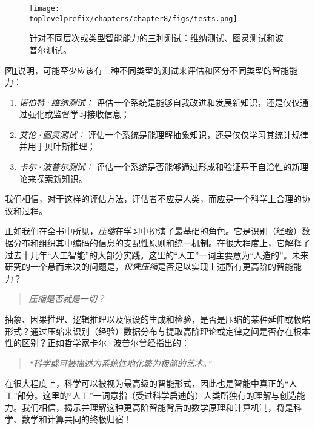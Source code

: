 \documentclass[../../book-main_zh.tex]{subfiles}
\begin{document}
\begin{figure}[t]
    \centering
    \texttt{[image: \\toplevelprefix/chapters/chapter8/figs/tests.png]}
    \caption{针对不同层次或类型智能能力的三种测试：维纳测试、图灵测试和波普尔测试。}
    \label{fig:three-tests}
\end{figure}

图\ref{fig:three-tests}说明，可能至少应该有三种不同类型的测试来评估和区分不同类型的智能能力：
\begin{enumerate}
    \item {\em 诺伯特·维纳测试：} 评估一个系统是能够自我改进和发展新知识，还是仅仅通过强化或监督学习接收信息；
    \item {\em 艾伦·图灵测试：} 评估一个系统是能理解抽象知识，还是仅仅学习其统计规律并用于贝叶斯推理；
    \item {\em 卡尔·波普尔测试：} 评估一个系统是否能够通过形成和验证基于自洽性的新理论来探索新知识。
\end{enumerate}
我们相信，对于这样的评估方法，评估者不应是人类，而应是一个科学上合理的协议和过程。



正如我们在全书中所见，\textit{压缩}在学习中扮演了最基础的角色。它是识别（经验）数据分布和组织其中编码的信息的支配性原则和统一机制。在很大程度上，它解释了过去十几年“人工智能”的大部分实践。这里的“人工”一词主要意为“人造的”。未来研究的一个悬而未决的问题是，\textit{仅凭压缩}是否足以实现上述所有更高阶的智能能力？
\begin{quote}
\begin{center}
        {\em 压缩是否就是一切？}
\end{center}
\end{quote}
抽象、因果推理、逻辑推理以及假设的生成和检验，是否是压缩的某种延伸或极端形式？通过压缩来识别（经验）数据分布与提取高阶理论或定律之间是否存在根本性的区别？正如哲学家卡尔·波普尔曾经指出的：
\begin{quote}
    \begin{center}
    {\em “科学或可被描述为系统性地化繁为极简的艺术。”}
    \end{center}
\end{quote}
在很大程度上，科学可以被视为最高级的智能形式，因此也是智能中真正的“人工”部分。这里的“人工”一词意指（受过科学启迪的）人类所独有的理解与创造能力。我们相信，揭示并理解这种更高阶智能背后的数学原理和计算机制，将是科学、数学和计算共同的终极归宿！
\end{document}
